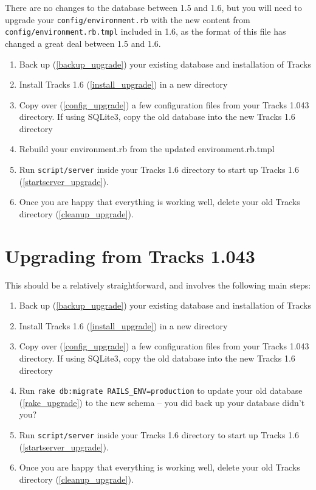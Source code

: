 \documentclass[10pt,twoside]{memoir}
\begin{document}
There are no changes to the database between 1.5 and 1.6, but you will need to upgrade your \texttt{config/environment.rb} with the new content from \texttt{config/environment.rb.tmpl} included in 1.6, as the format of this file has changed a great deal between 1.5 and 1.6.


\begin{enumerate}


\item Back up (\autoref{backup_upgrade}) your existing database and installation of Tracks

\item Install Tracks 1.6 (\autoref{install_upgrade}) in a new directory

\item Copy over (\autoref{config_upgrade}) a few configuration files from your Tracks 1.043 directory. If using SQLite3, copy the old database into the new Tracks 1.6 directory

\item Rebuild your environment.rb from the updated environment.rb.tmpl

\item Run \texttt{script/server} inside your Tracks 1.6 directory to start up Tracks 1.6 (\autoref{startserver_upgrade}).

\item Once you are happy that everything is working well, delete your old Tracks directory (\autoref{cleanup_upgrade}).
\end{enumerate}

\section{Upgrading from Tracks 1.043}
\label{upgrading_1043}

This should be a relatively straightforward, and involves the following main steps:


\begin{enumerate}


\item Back up (\autoref{backup_upgrade}) your existing database and installation of Tracks

\item Install Tracks 1.6 (\autoref{install_upgrade}) in a new directory

\item Copy over (\autoref{config_upgrade}) a few configuration files from your Tracks 1.043 directory. If using SQLite3, copy the old database into the new Tracks 1.6 directory

\item Run \texttt{rake db:migrate RAILS\_ENV=production} to update your old database (\autoref{rake_upgrade}) to the new schema -- you did back up your database didn't you?

\item Run \texttt{script/server} inside your Tracks 1.6 directory to start up Tracks 1.6 (\autoref{startserver_upgrade}).

\item Once you are happy that everything is working well, delete your old Tracks directory (\autoref{cleanup_upgrade}).
\end{enumerate}
\end{document}

